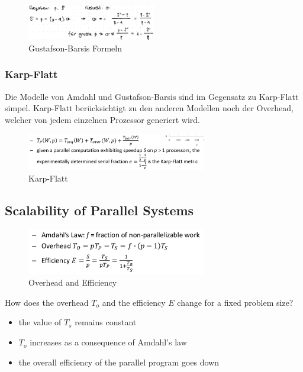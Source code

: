 \begin{figure}[H]
\centering
\includegraphics[width=0.5\textwidth]{figures/Gustafson-Barsis-Formeln.png}
\caption{Gustafson-Barsis Formeln}
\end{figure}

\hypertarget{karp-flatt}{%
\subsubsection{Karp-Flatt}\label{karp-flatt}}

Die Modelle von Amdahl und Gustafson-Barsis sind im Gegensatz zu
Karp-Flatt simpel. Karp-Flatt berücksichtigt zu den anderen Modellen
noch der Overhead, welcher von jedem einzelnen Prozessor generiert wird.

\begin{figure}[H]
\centering
\includegraphics[width=0.7\textwidth]{figures/karp-flatt.png}
\caption{Karp-Flatt}
\end{figure}

\hypertarget{scalability-of-parallel-systems}{%
\subsection{Scalability of Parallel
Systems}\label{scalability-of-parallel-systems}}

\begin{figure}[H]
\centering
\includegraphics[width=0.7\textwidth]{figures/scalability-efficiency.png}
\caption{Overhead and Efficiency}
\end{figure}

How does the overhead $T_o$ and the efficiency $E$ change for a fixed
problem size?

\begin{itemize}
\tightlist
\item
  the value of $T_s$ remains constant
\item
  $T_o$ increases as a consequence of Amdahl's law
\item
  the overall efficiency of the parallel program goes down
\end{itemize}

